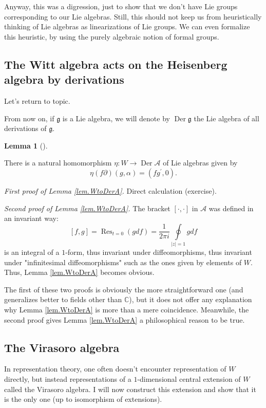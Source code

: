 \documentclass
[numbers=enddot,12pt,final,onecolumn,german,notitlepage]{scrartcl}%
\theoremstyle{definition}
\newtheorem{lem}[theo]{Lemma}
\newenvironment{lemma}[1][]
{\begin{lem}[#1]\begin{leftbar}}
{\end{leftbar}\end{lem}}
\begin{document}
Anyway, this was a digression, just to show that we don't have Lie groups
corresponding to our Lie algebras. Still, this should not keep us from
heuristically thinking of Lie algebras as linearizations of Lie groups. We can
even formalize this heuristic, by using the purely algebraic notion of formal groups.

\subsection{The Witt algebra acts on the Heisenberg algebra by derivations}

Let's return to topic.

From now on, if $\mathfrak{g}$ is a Lie algebra, we will denote by
$\operatorname*{Der}\mathfrak{g}$ the Lie algebra of all derivations of
$\mathfrak{g}$.

\begin{lemma}
\label{lem.WtoDerA}There is a natural homomorphism $\eta:W\rightarrow
\operatorname*{Der}\mathcal{A}$ of Lie algebras given by
\[
\eta\left(  f\partial\right)  \left(  g,\alpha\right)  =\left(  fg^{\prime
},0\right)  .
\]

\end{lemma}

\textit{First proof of Lemma \ref{lem.WtoDerA}.} Direct calculation (exercise).

\textit{Second proof of Lemma \ref{lem.WtoDerA}.} The bracket $\left[
\cdot,\cdot\right]  $ in $\mathcal{A}$ was defined in an invariant way:%
\[
\left[  f,g\right]  =\operatorname*{Res}\nolimits_{t=0}\left(  gdf\right)
=\dfrac{1}{2\pi i}\oint\limits_{\left\vert z\right\vert =1}gdf
\]
is an integral of a $1$-form, thus invariant under diffeomorphisms, thus
invariant under "infinitesimal diffeomorphisms" such as the ones given by
elements of $W$. Thus, Lemma \ref{lem.WtoDerA} becomes obvious.

The first of these two proofs is obviously the more straightforward one (and
generalizes better to fields other than $\mathbb{C}$), but it does not offer
any explanation why Lemma \ref{lem.WtoDerA} is more than a mere coincidence.
Meanwhile, the second proof gives Lemma \ref{lem.WtoDerA} a philosophical
reason to be true.

\subsection{The Virasoro algebra}

In representation theory, one often doesn't encounter representation of $W$
directly, but instead representations of a $1$-dimensional central extension
of $W$ called the Virasoro algebra. I will now construct this extension and
show that it is the only one (up to isomorphism of extensions).
\end{document}
